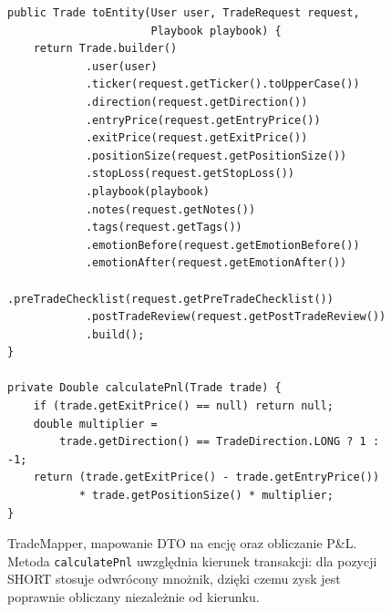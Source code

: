 \documentclass[12pt,a4paper]{article}
\begin{document}
\begin{figure}[H]
\begin{lstlisting}[style=java, caption={}, label={}]
public Trade toEntity(User user, TradeRequest request,
                      Playbook playbook) {
    return Trade.builder()
            .user(user)
            .ticker(request.getTicker().toUpperCase())
            .direction(request.getDirection())
            .entryPrice(request.getEntryPrice())
            .exitPrice(request.getExitPrice())
            .positionSize(request.getPositionSize())
            .stopLoss(request.getStopLoss())
            .playbook(playbook)
            .notes(request.getNotes())
            .tags(request.getTags())
            .emotionBefore(request.getEmotionBefore())
            .emotionAfter(request.getEmotionAfter())
            .preTradeChecklist(request.getPreTradeChecklist())
            .postTradeReview(request.getPostTradeReview())
            .build();
}

private Double calculatePnl(Trade trade) {
    if (trade.getExitPrice() == null) return null;
    double multiplier =
        trade.getDirection() == TradeDirection.LONG ? 1 : -1;
    return (trade.getExitPrice() - trade.getEntryPrice())
           * trade.getPositionSize() * multiplier;
}
\end{lstlisting}
\caption{TradeMapper, mapowanie DTO na encję oraz obliczanie P\&L. Metoda \texttt{calculatePnl} uwzględnia kierunek transakcji: dla pozycji SHORT stosuje odwrócony mnożnik, dzięki czemu zysk jest poprawnie obliczany niezależnie od kierunku.}
\label{fig:trade-mapper}
\end{figure}
\end{document}
